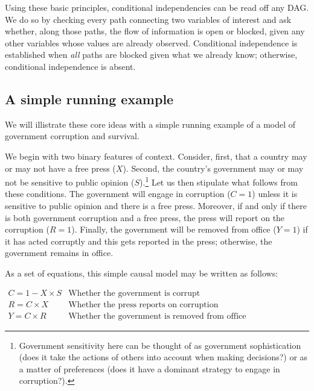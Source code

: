 \documentclass[12pt,]{book}
\let\rmarkdownfootnote\footnote%
\def\footnote{\protect\rmarkdownfootnote}
\begin{document}
Using these basic principles, conditional independencies can be read off any DAG. We do so by checking every path connecting two variables of interest and ask whether, along those paths, the flow of information is open or blocked, given any other variables whose values are already observed. Conditional independence is established when \emph{all} paths are blocked given what we already know; otherwise, conditional independence is absent.

\hypertarget{a-simple-running-example}{%
\subsection{A simple running example}\label{a-simple-running-example}}

We will illistrate these core ideas with a simple running example of a model of government corruption and survival.

We begin with two binary features of context. Consider, first, that a country may or may not have a free press (\(X\)). Second, the country's government may or may not be sensitive to public opinion (\(S\)).\footnote{Government sensitivity here can be thought of as government sophistication (does it take the actions of others into account when making decisions?) or as a matter of preferences (does it have a dominant strategy to engage in corruption?).} Let us then stipulate what follows from these conditions. The government will engage in corruption (\(C=1\)) unless it is sensitive to public opinion and there is a free press. Moreover, if and only if there is both government corruption and a free press, the press will report on the corruption (\(R=1\)). Finally, the government will be removed from office (\(Y=1\)) if it has acted corruptly and this gets reported in the press; otherwise, the government remains in office.

As a set of equations, this simple causal model may be written as follows:

\(\begin{array}{ll} C = 1-X\times S & \mbox{Whether the government is corrupt}\\ R = C\times X & \mbox{Whether the press reports on corruption}\\ Y = C\times R & \mbox{Whether the government is removed from office} \end{array}\)
\end{document}
